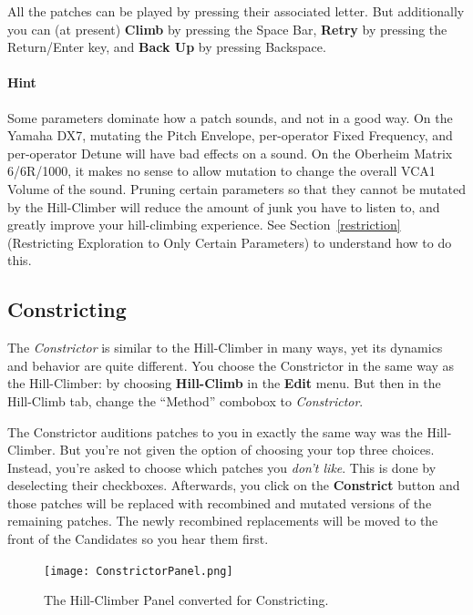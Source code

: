 \documentclass{article}
\begin{document}
All the patches can be played by pressing their associated letter.  But additionally you can (at present) {\bf Climb} by pressing the Space Bar, {\bf Retry} by pressing the Return/Enter key, and {\bf Back Up} by pressing Backspace.

\paragraph{\color{red}Hint} Some parameters dominate how a patch sounds, and not in a good way.  On the Yamaha DX7, mutating the Pitch Envelope, per-operator Fixed Frequency, and per-operator Detune will have bad effects on a sound.  On the Oberheim Matrix 6/6R/1000, it makes no sense to allow mutation to change the overall VCA1 Volume of the sound.   Pruning certain parameters so that they cannot be mutated by the Hill-Climber will reduce the amount of junk you have to listen to, and greatly improve your hill-climbing experience. See Section~\ref{restriction} (Restricting Exploration to Only Certain Parameters) to understand how to do this.

\subsection{Constricting}
\label{constrict}

The {\it Constrictor} is similar to the Hill-Climber in many ways, yet its dynamics and behavior are quite different.   You choose the Constrictor in the same way as the Hill-Climber: by choosing {\bf Hill-Climb} in the {\bf Edit} menu.  But then in the Hill-Climb tab, change the ``Method'' combobox to {\it Constrictor}.    

The Constrictor auditions patches to you in exactly the same way was the Hill-Climber.  But you're not given the option of choosing your top three choices.  Instead, you're asked to choose which patches you {\it don't like}.  This is done by deselecting their checkboxes.  Afterwards, you click on the {\bf Constrict} button and those patches will be replaced with recombined and mutated versions of the remaining patches.  The newly recombined replacements will be moved to the front of the Candidates so you hear them first.

\begin{figure}
\vspace{-1em}\texttt{[image: ConstrictorPanel.png]}
\vspace{-3em}
\caption{The Hill-Climber Panel converted for Constricting.}
\vspace{-2em}
\label{constrictorpanel}
\end{figure}
\end{document}

